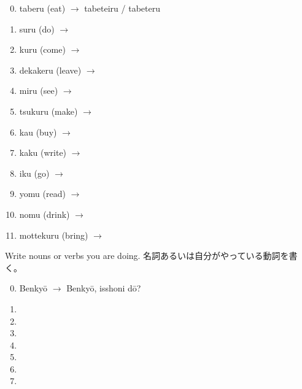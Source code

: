 \documentclass[uplatex,dvipdfmx,b5paper,english,10pt]{jsbook}
\begin{document}
\begin{multicols}{2}
 \begin{enumerate}
 \setcounter{enumi}{-1}
 \item taberu (eat)   $\rightarrow$ tabeteiru / tabeteru \hrulefill
 \item suru (do) $\rightarrow$ \hrulefill
 \item kuru (come)   $\rightarrow$ \hrulefill
 \item dekakeru (leave) $\rightarrow$ \hrulefill
 \item miru (see)  $\rightarrow$ \hrulefill
 \item tsukuru (make) $\rightarrow$ \hrulefill
 \item kau (buy)   $\rightarrow$ \hrulefill
 \item kaku (write)  $\rightarrow$ \hrulefill
 \item iku (go)   $\rightarrow$ \hrulefill
 \item yomu (read)   $\rightarrow$ \hrulefill
 \item nomu (drink)   $\rightarrow$ \hrulefill
 \item mottekuru (bring)   $\rightarrow$ \hrulefill
 \end{enumerate}
\end{multicols}

\vspace*{-1\baselineskip}

\begin{toiquestion}
\ifEnglish
Write nouns or verbs you are doing.
\else
名詞あるいは自分がやっている動詞を書く。
\fi
\end{toiquestion}

\begin{multicols}{2}
\begin{enumerate}
 \setcounter{enumi}{-1}
 \item Benky\=o $\rightarrow$ Benky\=o, isshoni d\=o?
 \item \hrulefill
 \item \hrulefill
 \item \hrulefill
 \item \hrulefill
 \item \hrulefill
 \item \hrulefill
 \item \hrulefill
\end{enumerate}
\end{multicols}

\vspace*{-1\baselineskip}
\end{document}
